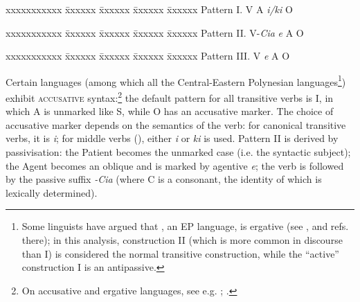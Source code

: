 \ea\label{ex:8.1a}
\begin{tabbing}
xxxxxxxxxxx \= xxxxxx \= xxxxxx \=  xxxxxx \= xxxxxx \kill
Pattern I. \>  V \>  A \>  \textit{i/ki} O
\end{tabbing}
\z

\ea\label{ex:8.1b}
\begin{tabbing}
xxxxxxxxxxx \= xxxxxx \= xxxxxx \=  xxxxxx \= xxxxxx \kill
Pattern II. \> V-\textit{Cia} \>  \textit{e} A \>  O  
\end{tabbing}
\z

\ea\label{ex:8.1c}
\begin{tabbing}
xxxxxxxxxxx \= xxxxxx \= xxxxxx \=  xxxxxx \= xxxxxx \kill
Pattern III.\>  V \>  \textit{e} A  \> O
\end{tabbing}
\z

Certain languages (among which all the Central-Eastern Polynesian languages\footnote{\label{fn:383}Some linguists have argued that , an EP language, is ergative (see \citealt[25]{Harlow2007Maori}, \citealt[26–36]{Pucilowsky2006} and refs. there); in this analysis, construction II (which is more common in  discourse than I) is considered the normal transitive construction, while the “active” construction I is an antipassive.}) exhibit \textsc{accusative} syntax:\footnote{\label{fn:384}On accusative and ergative languages, see e.g. \citet{Comrie1978}; \citet{Dixon1994}.} the default pattern for all transitive verbs is I, in which A is unmarked like S, while O has an accusative marker. The choice of accusative marker depends on the semantics of the verb: for canonical transitive verbs, it is \textit{i}; for middle verbs (), either \textit{i} or \textit{ki} is used. Pattern II is derived by passivisation: the Patient becomes the unmarked case (i.e. the syntactic subject); the Agent becomes an oblique and is marked by agentive \textit{e}; the verb is followed by the passive suffix \textit{-Cia} (where C is a consonant, the identity of which is lexically determined).

